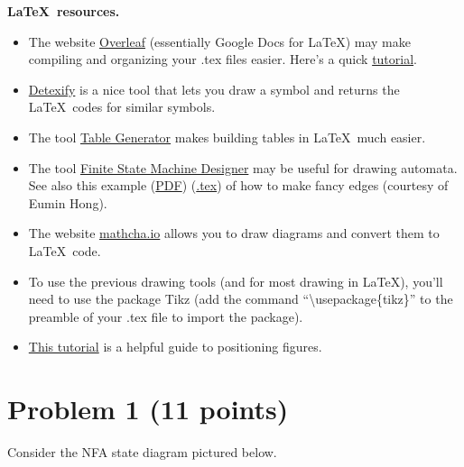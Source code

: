 \documentclass[letterpaper,11pt,twoside]{article}
\theoremstyle{plain}
\theoremstyle{definition}
\theoremstyle{remark}
\theoremstyle{restate}
\begin{document}
\textbf{\LaTeX~resources.}
\begin{itemize}
    \item The website \href{https://www.overleaf.com/}{Overleaf} (essentially Google Docs for LaTeX) may make compiling and organizing your .tex files easier. Here's a quick \href{https://www.overleaf.com/learn/latex/Learn_LaTeX_in_30_minutes}{tutorial}.
    \item \href{https://detexify.kirelabs.org/classify.html}{Detexify} is a nice tool that lets you draw a symbol and returns the \LaTeX~codes for similar symbols. 
    \item The tool \href{https://www.tablesgenerator.com/}{Table Generator} makes building tables in \LaTeX~much easier.
    \item The tool \href{http://madebyevan.com/fsm/}{Finite State Machine Designer} may be useful for drawing automata. See also this example (\href{https://static.us.edusercontent.com/files/HZeTXimODzWeLvHIqsvjL2BG}{PDF}) (\href{https://static.us.edusercontent.com/files/RI3W8tQNvHMWFe9MkXV1KztA}{.tex}) of how to make fancy edges (courtesy of Eumin Hong).
    \item The website \href{https://www.mathcha.io/}{mathcha.io} allows you to draw diagrams and convert them to \LaTeX~code.
    \item To use the previous drawing tools (and for most drawing in \LaTeX), you'll need to use the package Tikz (add the command ``\textbackslash usepackage\{tikz\}'' to the preamble of your .tex file to import the package). 
    \item \href{https://www.overleaf.com/learn/latex/Positioning_of_Figures}{This tutorial} is a helpful guide to positioning figures.
\end{itemize}  



\clearpage
\section{Problem 1 (11 points)}
    Consider the NFA state diagram pictured below.
    
\end{document}
